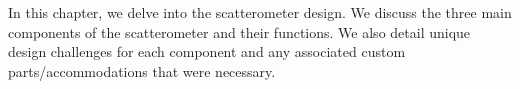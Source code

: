 \label{ch:design}

In this chapter, we delve into the scatterometer design. We discuss the three main components of the scatterometer and their functions. We also detail unique design challenges for each component and any associated custom parts/accommodations that were necessary.

